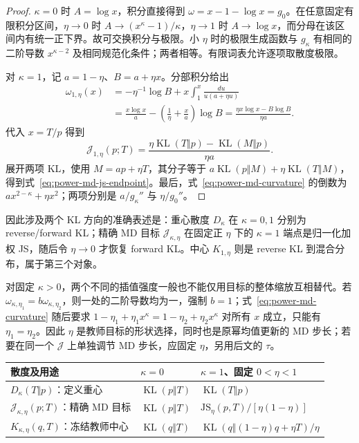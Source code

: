 \documentclass[lang=cn,scheme=chinese,openany]{../book/elegantbook}
\newcommand{\KL}{\operatorname{KL}}
\begin{document}
\begin{proof}
$\kappa=0$ 时 $A=\log x$，积分直接得到 $\omega=x-1-\log x=g_0$。在任意固定有限积分区间，$\eta\to0$ 时 $A\to(x^\kappa-1)/\kappa$，$\eta\to1$ 时 $A\to\log x$，而分母在该区间内有统一正下界。故可交换积分与极限。小 $\eta$ 时的极限生成函数与 $g_\kappa$ 有相同的二阶导数 $x^{\kappa-2}$ 及相同规范化条件；两者相等。有限词表允许逐项取散度极限。

对 $\kappa=1$，记 $a=1-\eta$、$B=a+\eta x$。分部积分给出
\begin{align}
 \omega_{1,\eta}(x)
 &=-\eta^{-1}\log B+x\int_1^x\frac{du}{u(a+\eta u)}\\
 &=\frac{x\log x}{a}-\left(\frac1\eta+\frac xa\right)\log B
 =\frac{\eta x\log x-B\log B}{\eta a}.
\end{align}
代入 $x=T/p$ 得到
\begin{equation}
 \mathcal J_{1,\eta}(p;T)
 =\frac{\eta\KL(T\Vert p)-\KL(M\Vert p)}{\eta a}.
\end{equation}
展开两项 KL，使用 $M=ap+\eta T$，其分子等于 $a\KL(p\Vert M)+\eta\KL(T\Vert M)$，得到式~\eqref{eq:power-md-js-endpoint}。最后，式~\eqref{eq:power-md-curvature} 的倒数为 $a x^{2-\kappa}+\eta x^2$；两项分别是 $a/g_\kappa''$ 与 $\eta/g_0''$。
\end{proof}

因此涉及两个 KL 方向的准确表述是：重心散度 $D_\kappa$ 在 $\kappa=0,1$ 分别为 reverse/forward KL；精确 MD 目标 $\mathcal J_{\kappa,\eta}$ 在固定正 $\eta$ 下的 $\kappa=1$ 端点是归一化加权 JS，随后令 $\eta\to0$ 才恢复 forward KL。中心 $K_{1,\eta}$ 则是 reverse KL 到混合分布，属于第三个对象。

对固定 $\kappa>0$，两个不同的插值强度一般也不能仅用目标的整体缩放互相替代。若 $\omega_{\kappa,\eta_1}=b\omega_{\kappa,\eta_2}$，则一处的二阶导数均为一，强制 $b=1$；式~\eqref{eq:power-md-curvature} 随后要求 $1-\eta_1+\eta_1x^\kappa=1-\eta_2+\eta_2x^\kappa$ 对所有 $x$ 成立，只能有 $\eta_1=\eta_2$。因此 $\eta$ 是教师目标的形状选择，同时也是原幂均值更新的 MD 步长；若要在同一个 $\mathcal J$ 上单独调节 MD 步长，应固定 $\eta$，另用后文的 $\tau$。

\begin{center}
\small
\begin{tabular}{lll}
\toprule
散度及用途 & $\kappa=0$ & $\kappa=1$、固定 $0<\eta<1$\\
\midrule
$D_\kappa(T\Vert p)$：定义重心 & $\KL(p\Vert T)$ & $\KL(T\Vert p)$\\
$\mathcal J_{\kappa,\eta}(p;T)$：精确 MD 目标 & $\KL(p\Vert T)$ & $\mathrm{JS}_\eta(p,T)/[\eta(1-\eta)]$\\
$K_{\kappa,\eta}(q,T)$：冻结教师中心 & $\KL(q\Vert T)$ & $\KL(q\Vert(1-\eta)q+\eta T)/\eta$\\
\bottomrule
\end{tabular}
\end{center}
\end{document}
